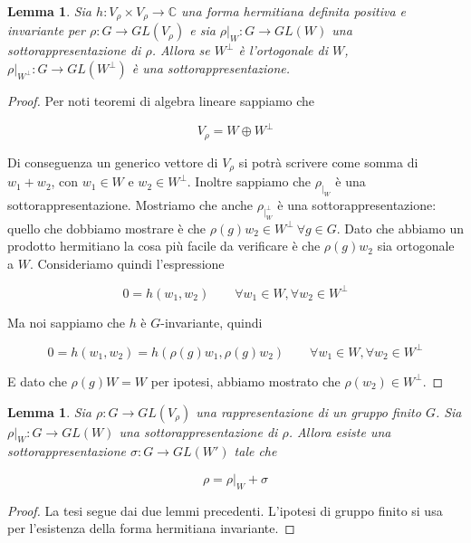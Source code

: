 \documentclass[11pt]{article}
\theoremstyle{plain}
\newtheorem{lemma}[thm]{Lemma}
\theoremstyle{definition}
\theoremstyle{remark}
\newcommand{\C}{\mathbb{C}}
\begin{document}
\begin{lemma}
Sia $h: V_\rho \times V_\rho \to \C$ una forma hermitiana definita positiva e invariante per $\rho: G \to GL(V_\rho)$ e sia $\rho|_W: G \to GL(W)$ una sottorappresentazione di $\rho$. Allora se $W^\perp$ è l'ortogonale di $W$, $\rho|_{W^\perp}: G \to GL(W^\perp)$ è una sottorappresentazione.

\end{lemma}

\begin{proof}

Per noti teoremi di algebra lineare sappiamo che

\[ V_\rho = W \oplus W^\perp \]

Di conseguenza un generico vettore di $V_\rho$ si potrà scrivere come somma di $w_1 + w_2$, con $w_1 \in W$ e $w_2 \in W^\perp$. Inoltre sappiamo che $\rho_{|_W}$ è una sottorappresentazione. Mostriamo che anche $\rho_{|_W^\perp}$ è una sottorappresentazione: quello che dobbiamo mostrare è che $\rho(g) w_2 \in W^\perp \ \forall g \in G$. Dato che abbiamo un prodotto hermitiano la cosa più facile da verificare è che $\rho(g) w_2$ sia ortogonale a $W$. Consideriamo quindi l'espressione

\[ 0 = h(w_1, w_2) \qquad \forall w_1 \in W, \forall w_2 \in W^\perp\]

Ma noi sappiamo che $h$ è $G$-invariante, quindi

\[ 0 = h(w_1, w_2) = h(\rho(g) w_1, \rho(g) w_2) \qquad \forall w_1 \in W, \forall w_2 \in W^\perp \]

E dato che $\rho(g) W = W$ per ipotesi, abbiamo mostrato che $\rho(w_2) \in W^\perp$. 
\end{proof}




\begin{lemma}
Sia $\rho: G \to GL(V_\rho)$ una rappresentazione di un gruppo finito $G$. Sia $\rho|_W: G \to GL(W)$ una sottorappresentazione di $\rho$. Allora esiste una sottorappresentazione $\sigma: G \to GL(W')$ tale che

\[\rho = \rho|_W + \sigma \]
\end{lemma}


\begin{proof} La tesi segue dai due lemmi precedenti. L'ipotesi di gruppo finito si usa per l'esistenza della forma hermitiana invariante. 
\end{proof}
\end{document}
